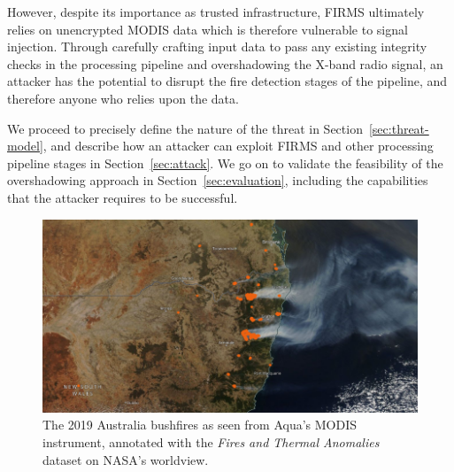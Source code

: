 However, despite its importance as trusted infrastructure, FIRMS ultimately relies on unencrypted MODIS data which is therefore vulnerable to signal injection.
Through carefully crafting input data to pass any existing integrity checks in the processing pipeline and overshadowing the X-band radio signal, an attacker has the potential to disrupt the fire detection stages of the pipeline, and therefore anyone who relies upon the data.

We proceed to precisely define the nature of the threat in Section~\ref{sec:threat-model}, and describe how an attacker can exploit FIRMS and other processing pipeline stages in Section~\ref{sec:attack}.
We go on to validate the feasibility of the overshadowing approach in Section~\ref{sec:evaluation}, including the capabilities that the attacker requires to be successful.


\begin{figure}
    \centering
    \includegraphics[width=\columnwidth]{diagrams/bushfire.png}
    \caption{The 2019 Australia bushfires as seen from Aqua's MODIS instrument, annotated with the \textit{Fires and Thermal Anomalies} dataset on NASA's worldview.\protect\footnotemark}
    \label{fig:bushfire}
\end{figure}




